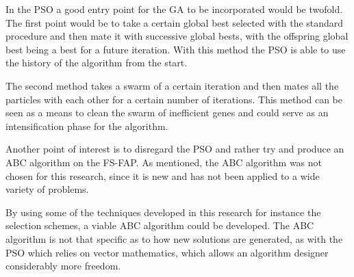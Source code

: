 In the PSO a good entry point for the GA to be incorporated would be twofold. The first point would be to take a certain global best selected with the standard procedure and then mate it with successive global bests, with the offspring global best being a best for a future iteration. With this method the PSO is able to use the history of the algorithm from the start.

The second method takes a swarm of a certain iteration and then mates all the particles with each other for a certain number of iterations. This method can be seen as a means to clean the swarm of inefficient genes and could serve as an intensification phase for the algorithm.

Another point of interest is to disregard the PSO and rather try and produce an ABC algorithm on the FS-FAP. As mentioned, the ABC algorithm was not chosen for this research, since it is new and has not been applied to a wide variety of problems. 

By using some of the techniques developed in this research for instance the selection schemes, a viable ABC algorithm could be developed. The ABC algorithm is not that specific as to how new solutions are generated, as with the PSO which relies on vector mathematics, which allows an algorithm designer considerably more freedom.






